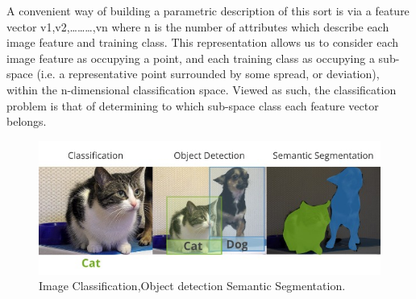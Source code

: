 \documentclass{article}
\begin{document}
A convenient way of building a parametric description of this sort is via a feature vector v1,v2,………,vn where n is the number of attributes which describe each image feature and training class. This representation allows us to consider each image feature as occupying a point, and each training class as occupying a sub-space (i.e. a representative point surrounded by some spread, or deviation), within the n-dimensional classification space. Viewed as such, the classification problem is that of determining to which sub-space class each feature vector belongs.
\begin{figure}[H]
  \centering
  \includegraphics[width=0.7\linewidth]{images/classification_detection_segmentaion_comparisons.jpeg}
   \caption{Image Classification,Object detection Semantic Segmentation.}
\end{figure}
\end{document}
